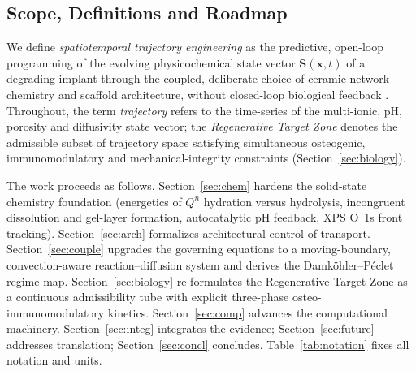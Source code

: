 \documentclass[11pt]{article}
\begin{document}
\subsection{Scope, Definitions and Roadmap}


We define \emph{spatiotemporal trajectory engineering} as the predictive, open-loop programming of the evolving physicochemical state vector $\mathbf{S}(\mathbf{x},t)$ of a degrading implant through the coupled, deliberate choice of ceramic network chemistry and scaffold architecture, without closed-loop biological feedback \cite{Workie2025b,Workie2026c}. Throughout, the term \emph{trajectory} refers to the time-series of the multi-ionic, pH, porosity and diffusivity state vector; the \emph{Regenerative Target Zone} denotes the admissible subset of trajectory space satisfying simultaneous osteogenic, immunomodulatory and mechanical-integrity constraints (Section~\ref{sec:biology}).


The work proceeds as follows. Section~\ref{sec:chem} hardens the solid-state chemistry foundation (energetics of $Q^n$ hydration versus hydrolysis, incongruent dissolution and gel-layer formation, autocatalytic pH feedback, XPS O~1s front tracking). Section~\ref{sec:arch} formalizes architectural control of transport. Section~\ref{sec:couple} upgrades the governing equations to a moving-boundary, convection-aware reaction--diffusion system and derives the Damk\"ohler--P\'eclet regime map. Section~\ref{sec:biology} re-formulates the Regenerative Target Zone as a continuous admissibility tube with explicit three-phase osteo-immunomodulatory kinetics. Section~\ref{sec:comp} advances the computational machinery. Section~\ref{sec:integ} integrates the evidence; Section~\ref{sec:future} addresses translation; Section~\ref{sec:concl} concludes. Table~\ref{tab:notation} fixes all notation and units.
\end{document}
